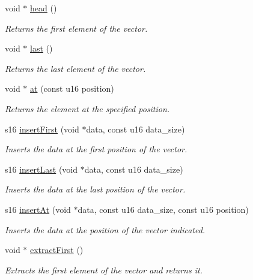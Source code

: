 \begin{DoxyCompactItemize}
void $\ast$ \hyperlink{class_vector_ab8f205d5a5da8672d6aa048b773a852f}{head} ()
\begin{DoxyCompactList}\small\item\em Returns the first element of the vector. \end{DoxyCompactList}\item 
void $\ast$ \hyperlink{class_vector_a753c7105d2a6acf776b190d29cecd356}{last} ()
\begin{DoxyCompactList}\small\item\em Returns the last element of the vector. \end{DoxyCompactList}\item 
void $\ast$ \hyperlink{class_vector_a56f4698af2478b8dc6710094855f65e9}{at} (const u16 position)
\begin{DoxyCompactList}\small\item\em Returns the element at the specified position. \end{DoxyCompactList}\item 
s16 \hyperlink{class_vector_a58d0f4970cc96457f60e12a0201ce58f}{insert\+First} (void $\ast$data, const u16 data\+\_\+size)
\begin{DoxyCompactList}\small\item\em Inserts the data at the first position of the vector. \end{DoxyCompactList}\item 
s16 \hyperlink{class_vector_a4e762aa3819ce9c217d38095f6fb3a0b}{insert\+Last} (void $\ast$data, const u16 data\+\_\+size)
\begin{DoxyCompactList}\small\item\em Inserts the data at the last position of the vector. \end{DoxyCompactList}\item 
s16 \hyperlink{class_vector_a87b88764d408955bc78fa3372102a7fb}{insert\+At} (void $\ast$data, const u16 data\+\_\+size, const u16 position)
\begin{DoxyCompactList}\small\item\em Inserts the data at the position of the vector indicated. \end{DoxyCompactList}\item 
void $\ast$ \hyperlink{class_vector_adc981406679edbd18e0125dd7d322229}{extract\+First} ()
\begin{DoxyCompactList}\small\item\em Extracts the first element of the vector and returns it. \end{DoxyCompactList}\item 

\end{DoxyCompactItemize}
